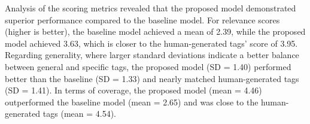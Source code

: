 





Analysis of the scoring metrics revealed that the proposed model demonstrated superior performance compared to the baseline model. For relevance scores (higher is better), the baseline model achieved a mean of 2.39, while the proposed model achieved 3.63, which is closer to the human-generated tags' score of 3.95. Regarding generality, where larger standard deviations indicate a better balance between general and specific tags, the proposed model (SD = 1.40) performed better than the baseline (SD = 1.33) and nearly matched human-generated tags (SD = 1.41). In terms of coverage, the proposed model (mean = 4.46) outperformed the baseline model (mean = 2.65) and was close to the human-generated tags (mean = 4.54).

